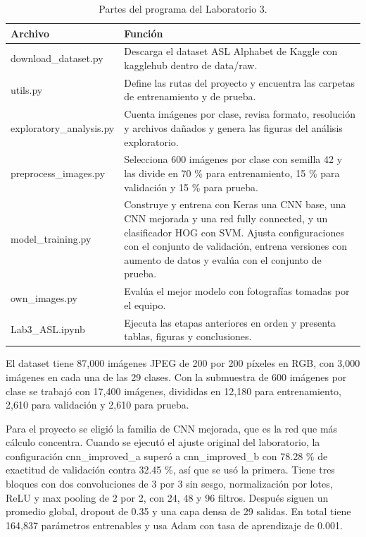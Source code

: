 \documentclass[11pt,letterpaper]{article}
\begin{document}
\begin{table}[H]
\centering
\small
\caption{Partes del programa del Laboratorio 3.}
\label{tab:partes}
\begin{tabular}{L{4.2cm}L{11.2cm}}
\toprule
Archivo & Función \\
\midrule
download\_dataset.py & Descarga el dataset ASL Alphabet de Kaggle con kagglehub dentro de data/raw. \\
utils.py & Define las rutas del proyecto y encuentra las carpetas de entrenamiento y de prueba. \\
exploratory\_analysis.py & Cuenta imágenes por clase, revisa formato, resolución y archivos dañados y genera las figuras del análisis exploratorio. \\
preprocess\_images.py & Selecciona 600 imágenes por clase con semilla 42 y las divide en 70 \% para entrenamiento, 15 \% para validación y 15 \% para prueba. \\
model\_training.py & Construye y entrena con Keras una CNN base, una CNN mejorada y una red fully connected, y un clasificador HOG con SVM. Ajusta configuraciones con el conjunto de validación, entrena versiones con aumento de datos y evalúa con el conjunto de prueba. \\
own\_images.py & Evalúa el mejor modelo con fotografías tomadas por el equipo. \\
Lab3\_ASL.ipynb & Ejecuta las etapas anteriores en orden y presenta tablas, figuras y conclusiones. \\
\bottomrule
\end{tabular}
\end{table}

El dataset tiene 87,000 imágenes JPEG de 200 por 200 píxeles en RGB, con 3,000 imágenes en cada una de las 29 clases. Con la submuestra de 600 imágenes por clase se trabajó con 17,400 imágenes, divididas en 12,180 para entrenamiento, 2,610 para validación y 2,610 para prueba.

Para el proyecto se eligió la familia de CNN mejorada, que es la red que más cálculo concentra. Cuando se ejecutó el ajuste original del laboratorio, la configuración cnn\_improved\_a superó a cnn\_improved\_b con 78.28 \% de exactitud de validación contra 32.45 \%, así que se usó la primera. Tiene tres bloques con dos convoluciones de 3 por 3 sin sesgo, normalización por lotes, ReLU y max pooling de 2 por 2, con 24, 48 y 96 filtros. Después siguen un promedio global, dropout de 0.35 y una capa densa de 29 salidas. En total tiene 164,837 parámetros entrenables y usa Adam con tasa de aprendizaje de 0.001.
\end{document}
